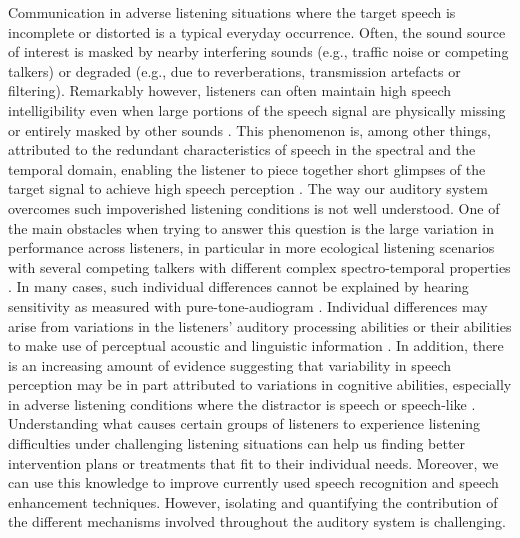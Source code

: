 \documentclass[a4paper, twoside]{templates/ociamthesis}
\begin{document}
Communication in adverse listening situations where the target speech is incomplete or distorted is a typical everyday occurrence. Often, the sound source of interest is masked by nearby interfering sounds (e.g., traffic noise or competing talkers) or degraded (e.g., due to reverberations, transmission artefacts or filtering). Remarkably however, listeners can often maintain high speech intelligibility even when large portions of the speech signal are physically missing or entirely masked by other sounds \autocite{Miller1950,Baskent2016}. This phenomenon is, among other things, attributed to the redundant characteristics of speech in the spectral and the temporal domain, enabling the listener to piece together short glimpses of the target signal to achieve high speech perception \autocite[i.e., ``glimpsing theory'';][]{Cooke2006}.
The way our auditory system overcomes such impoverished listening conditions is not well understood.
One of the main obstacles when trying to answer this question is the large variation in performance across listeners, in particular in more ecological listening scenarios with several competing talkers with different complex spectro-temporal properties \autocite{Surprenant2001}.
In many cases, such individual differences cannot be explained by hearing sensitivity as measured with pure-tone-audiogram \autocite{Humes2010,Kidd2012}.
Individual differences may arise from variations in the listeners' auditory processing abilities or their abilities to make use of perceptual acoustic and linguistic information \autocite{Pichora-Fuller2006,Surprenant2001}.
In addition, there is an increasing amount of evidence suggesting that variability in speech perception may be in part attributed to variations in cognitive abilities, especially in adverse listening conditions where the distractor is speech or speech-like \autocites[see review by][]{Akeroyd2008,Arlinger2009,Kidd2012,VanEsch2013,Humes2013}.
Understanding what causes certain groups of listeners to experience listening difficulties under challenging listening situations can help us finding better intervention plans or treatments that fit to their individual needs. Moreover, we can use this knowledge to improve currently used speech recognition and speech enhancement techniques.
However, isolating and quantifying the contribution of the different mechanisms involved throughout the auditory system is challenging.\\
\end{document}
